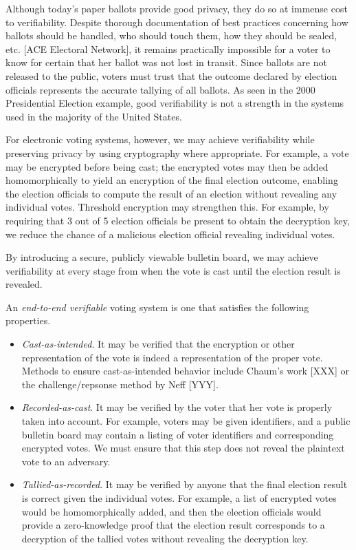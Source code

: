 Although today's paper ballots provide good privacy, they do so at immense cost to verifiability. Despite thorough documentation of best practices concerning how ballots should be handled, who should touch them, how they should be sealed, etc. [ACE Electoral Network], it remains practically impossible for a voter to know for certain that her ballot was not lost in transit. Since ballots are not released to the public, voters must trust that the outcome declared by election officials represents the accurate tallying of all ballots. As seen in the 2000 Presidential Election example, good verifiability is not a strength in the systems used in the majority of the United States.

For electronic voting systems, however, we may achieve verifiability while preserving privacy by using cryptography where appropriate. For example, a vote may be encrypted before being cast; the encrypted votes may then be added homomorphically to yield an encryption of the final election outcome, enabling the election officials to compute the result of an election without revealing any individual votes. Threshold encryption may strengthen this. For example, by requiring that 3 out of 5 election officials be present to obtain the decryption key, we reduce the chance of a malicious election official revealing individual votes.

By introducing a secure, publicly viewable bulletin board, we may achieve verifiability at every stage from when the vote is cast until the election result is revealed.

\begin{definition} An \emph{end-to-end verifiable} voting system is one that satisfies the following properties.
\begin{itemize}
\item \emph{Cast-as-intended}. It may be verified that the encryption or other representation of the vote is indeed a representation of the proper vote. Methods to ensure cast-as-intended behavior include Chaum's work [XXX] or the challenge/repsonse method by Neff [YYY].
\item \emph{Recorded-as-cast}. It may be verified by the voter that her vote is properly taken into account. For example, voters may be given identifiers, and a public bulletin board may contain a listing of voter identifiers and corresponding encrypted votes. We must ensure that this step does not reveal the plaintext vote to an adversary.
\item \emph{Tallied-as-recorded}. It may be verified by anyone that the final election result is correct given the individual votes. For example, a list of encrypted votes would be homomorphically added, and then the election officials would provide a zero-knowledge proof that the election result corresponds to a decryption of the tallied votes without revealing the decryption key.
\end{itemize}
\end{definition}

